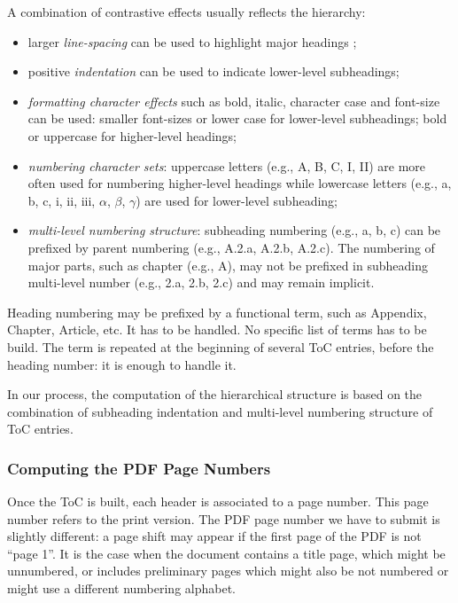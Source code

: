 A combination of contrastive effects usually reflects the hierarchy:
\begin{itemize}
    \item larger \emph{line-spacing} can be used to highlight major headings ;
    \item positive \emph{indentation} can be used to indicate lower-level subheadings;
    \item \emph{formatting character effects} such as bold, italic, character case and font-size can be used: smaller font-sizes or lower case for lower-level subheadings; bold or uppercase for higher-level headings;
    \item \emph{numbering character sets}: uppercase letters (e.g., A, B, C, I, II)  are more often used for numbering higher-level headings while lowercase letters (e.g., a, b, c, i, ii, iii, $\alpha$, $\beta$, $\gamma$) are used for lower-level subheading;
    \item \emph{multi-level numbering structure}: subheading numbering (e.g., a, b, c) can be prefixed by parent numbering (e.g., A.2.a, A.2.b, A.2.c). The numbering of major parts, such as chapter (e.g., A), may not be prefixed in subheading multi-level number (e.g., 2.a, 2.b, 2.c) and may remain implicit.
\end{itemize}
 
Heading numbering may be prefixed by a functional term, such as Appendix, Chapter, Article, etc. It has to be handled. No specific list of terms has to be build. The term is repeated at the beginning of several ToC entries, before the heading number: it is enough to handle it.

In our process, the computation of the hierarchical structure is based on the combination of subheading indentation and multi-level numbering structure of ToC entries.

\subsubsection{Computing the PDF Page Numbers}

Once the ToC is built, each header is associated to a page number. This page number refers to the print version. The PDF page number we have to submit is slightly different: a page shift may appear if the first page of the PDF is not ``page 1''. It is the case when the document contains a title page, which might be unnumbered, or includes preliminary pages which might also be not numbered or might
use a different numbering alphabet.


